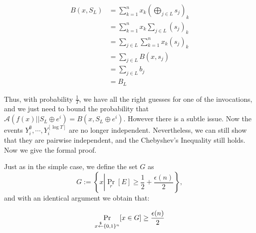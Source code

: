 \documentclass[12pt]{tufte-book}
\newcommand{\ma}{\mathcal{A}}
\begin{document}
\begin{align*}
B(x,S_L) &= \sum_{k=1}^n x_k (\bigoplus_{j \in L} s_j)_k \\ 
         &=  \sum_{k=1}^n x_k \sum_{j \in L} \left(s_j\right)_k \\
         &= \sum_{j \in L} \sum_{k=1}^n x_k (s_j)_k \\
         &= \sum_{j \in L} B(x,s_j) \\
         &= \sum_{j\in L} b_j  \\
         &= B_L
\end{align*}

Thus, with probability $\frac{1}{T}$, we have all the right guesses for one of the invocations, and we just need to bound the probability that $\ma(f(x) || S_L \oplus e^i) = B(x, S_L \oplus e^i)$.
However there is a subtle issue. Now the events $Y_i^\emptyset, \cdots, Y_i^{[\log T]}$ are no longer independent.
Nevertheless, we can still show that they are pairwise independent, and the Chebyshev's Inequality still holds. Now we give the formal proof.

Just as in the simple case, we define the set $G$ as
$$G := \left\{x \left| \Pr_r \left[ E \right]\geq \frac{1}{2} + \frac{\epsilon(n)}{2} \right. \right\},$$
and with an identical argument we obtain that:

$$\Pr_{x \stackrel{\$}{\leftarrow} \{0,1\}^{n}}[x \in G] \geq \frac{\epsilon(n)}{2}$$
\end{document}
